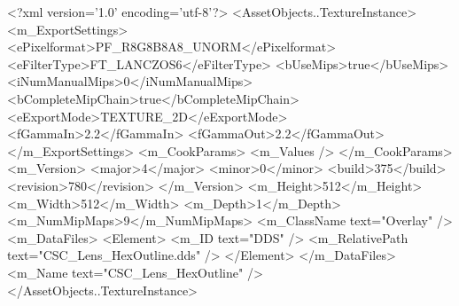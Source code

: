 <?xml version='1.0' encoding='utf-8'?>
<AssetObjects..TextureInstance>
  <m_ExportSettings>
    <ePixelformat>PF_R8G8B8A8_UNORM</ePixelformat>
    <eFilterType>FT_LANCZOS6</eFilterType>
    <bUseMips>true</bUseMips>
    <iNumManualMips>0</iNumManualMips>
    <bCompleteMipChain>true</bCompleteMipChain>
    <eExportMode>TEXTURE_2D</eExportMode>
    <fGammaIn>2.2</fGammaIn>
    <fGammaOut>2.2</fGammaOut>
  </m_ExportSettings>
  <m_CookParams>
    <m_Values />
  </m_CookParams>
  <m_Version>
    <major>4</major>
    <minor>0</minor>
    <build>375</build>
    <revision>780</revision>
  </m_Version>
  <m_Height>512</m_Height>
  <m_Width>512</m_Width>
  <m_Depth>1</m_Depth>
  <m_NumMipMaps>9</m_NumMipMaps>
  <m_ClassName text="Overlay" />
  <m_DataFiles>
    <Element>
      <m_ID text="DDS" />
      <m_RelativePath text="CSC_Lens_HexOutline.dds" />
    </Element>
  </m_DataFiles>
  <m_Name text="CSC_Lens_HexOutline" />
</AssetObjects..TextureInstance>
